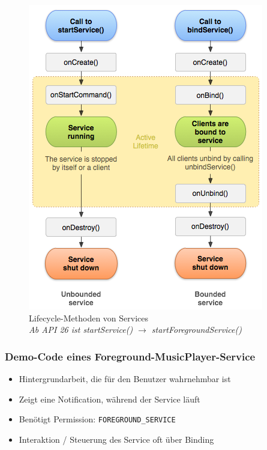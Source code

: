 \documentclass[a4paper]{article}
\begin{document}
		\begin{figure}[!htb]
			\centering
			\includegraphics[width=.7\textwidth]{img/services_lifecycle.png}
			\caption{Lifecycle-Methoden von Services\\
			\textit{Ab API 26 ist startService() $\rightarrow$ startForegroundService()}}
			\label{fig:retrofit_demo}
		\end{figure}
	
		\newpage
	
		\subsubsection{Demo-Code eines Foreground-MusicPlayer-Service}
		
		\begin{itemize}
			
			\item Hintergrundarbeit, die für den Benutzer wahrnehmbar ist
			\item Zeigt eine Notification, während der Service läuft
			\item Benötigt Permission: \texttt{FOREGROUND\_SERVICE}
			\item Interaktion / Steuerung des Service oft über Binding
			
		\end{itemize}
	
\end{document}
